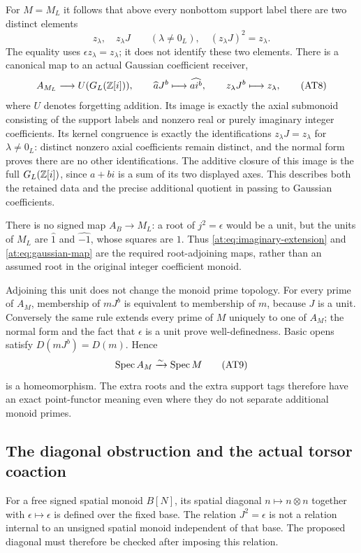 For $M=M_L$ it follows that above every nonbottom support label
there are two distinct elements
\[
 z_\lambda,\quad z_\lambda J\qquad(\lambda\ne0_L),
 \quad (z_\lambda J)^2=z_\lambda.
 \tag{AT7}\label{at:eq:support-tags}
\]
The equality uses $\epsilon z_\lambda=z_\lambda$; it does not
identify these two elements. There is a canonical map to an
actual Gaussian coefficient receiver,
\[
 A_{M_L}\longrightarrow U(G_L(\mathbb Z[i])),\qquad
 \widehat aJ^b\longmapsto\widehat{ai^b},\qquad
 z_\lambda J^b\longmapsto z_\lambda,
 \tag{AT8}\label{at:eq:gaussian-map}
\]
where $U$ denotes forgetting addition. Its image is exactly the
axial submonoid consisting of the support labels and nonzero real
or purely imaginary integer coefficients. Its kernel congruence
is exactly the identifications $z_\lambda J=z_\lambda$ for
$\lambda\ne0_L$: distinct nonzero axial coefficients remain
distinct, and the normal form proves there are no other
identifications. The additive closure of this image is the full
$G_L(\mathbb Z[i])$, since $a+bi$ is a sum of its two displayed axes.
This describes both the retained data and the precise additional
quotient in passing to Gaussian coefficients.

There is no signed map $A_B\to M_L$: a root of $j^2=\epsilon$
would be a unit, but the units of $M_L$ are $\widehat1$ and
$\widehat{-1}$, whose squares are $1$. Thus
\eqref{at:eq:imaginary-extension} and \eqref{at:eq:gaussian-map}
are the required root-adjoining maps, rather than an assumed
root in the original integer coefficient monoid.

Adjoining this unit does not change the monoid prime topology.
For every prime of $A_M$, membership of $mJ^b$ is equivalent to
membership of $m$, because $J$ is a unit. Conversely the same
rule extends every prime of $M$ uniquely to one of $A_M$;
the normal form and the fact that $\epsilon$ is a unit prove
well-definedness. Basic opens satisfy $D(mJ^b)=D(m)$. Hence
\[
 \operatorname{Spec} A_M\xrightarrow{\sim}\operatorname{Spec} M
 \tag{AT9}\label{at:eq:spectrum-root}
\]
is a homeomorphism. The extra roots and the extra support tags
therefore have an exact point-functor meaning even where they
do not separate additional monoid primes.

\subsection{The diagonal obstruction and the actual torsor coaction}

For a free signed spatial monoid $B[N]$, its spatial diagonal
$n\mapsto n\otimes n$ together with $\epsilon\mapsto\epsilon$
is defined over the fixed base. The relation $J^2=\epsilon$ is
not a relation internal to an unsigned spatial monoid independent
of that base. The proposed diagonal must therefore be checked
after imposing this relation.


